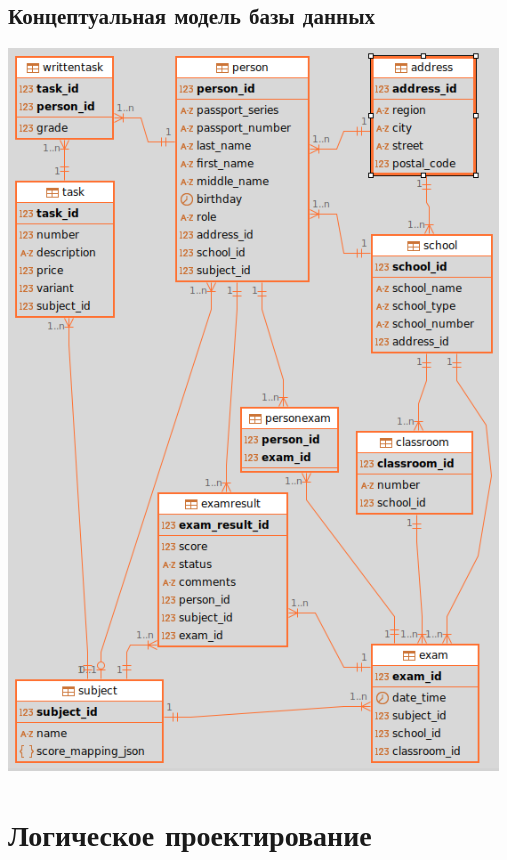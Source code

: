 \documentclass[a4paper]{article}
\begin{document}
\subsection{Концептуальная модель базы данных}
\includegraphics[width=13cm]{data/er_kmdb.png}

\section{Логическое проектирование}
\end{document}
